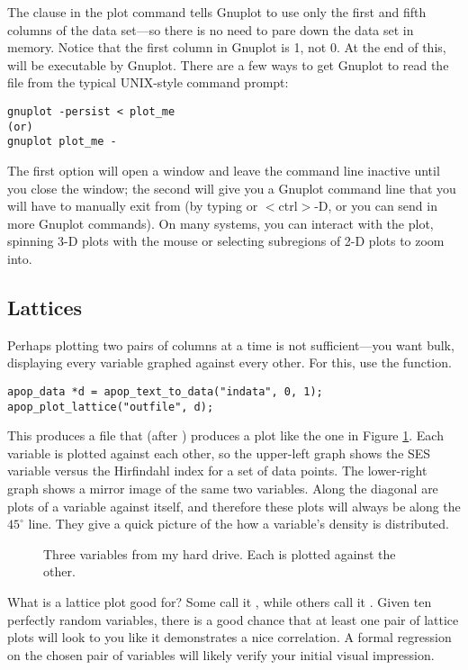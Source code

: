 The clause  in the plot command tells Gnuplot to use
only the first and fifth columns of the data set---so there is no need to pare
down the data set in memory. Notice that the first column in Gnuplot is
1, not 0. At the end of this,  will be executable by
Gnuplot. There are a few ways to get Gnuplot to read the file from the
typical UNIX-style command prompt:
\begin{lstlisting}
gnuplot -persist < plot_me
(or)
gnuplot plot_me -
\end{lstlisting}
The first option will open a window and leave the command line inactive
until you close the window;
the second will give you a Gnuplot command line that you will have to
manually exit
from (by typing  or $<$ctrl$>$-D, or you can send in more
Gnuplot commands). On many systems, you can
interact with the plot, spinning 3-D plots with the mouse or selecting
subregions of 2-D plots to zoom into.

\subsection{Lattices}  
Perhaps plotting two pairs of columns at a time is not sufficient---you
want bulk, displaying every variable graphed against every other. For
this, use the  function.

\begin{lstlisting}
apop_data *d = apop_text_to_data("indata", 0, 1);
apop_plot_lattice("outfile", d);
\end{lstlisting}
This produces a file that (after ) produces
a plot like the one in Figure \ref{trellis}. Each variable is plotted
against each other, so the upper-left graph shows the SES variable
versus the Hirfindahl index for a set of data points. The lower-right
graph shows a mirror image of the same two variables. Along the diagonal
are plots of a variable against itself, and therefore these plots will
always be along the $45^\circ$ line. They give a quick picture of the
how a variable's density is distributed.

\begin{figure}
\caption{Three variables from my hard drive. Each is plotted against the
other.}\label{trellis}
\end{figure}

What is a lattice plot good for? Some call it , while others call it . Given ten perfectly
random variables, there is a good chance that at least one pair of
lattice plots will look to you like it demonstrates a nice correlation.
A formal regression on the chosen pair of variables will likely
verify your initial visual impression. 

